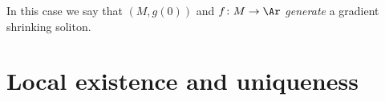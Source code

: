 \begin{definition}\label{def:gradient-shrinking-soliton-generator}
\leanok

In this case we say that $(M,g(0))$ and $f\colon M\to \Ar$ {\em
generate} a gradient shrinking soliton.
\end{definition}


\section{Local existence and uniqueness}\label{3.3}

\begin{theorem}\label{thm:local-existence-uniqueness}

\end{theorem}
